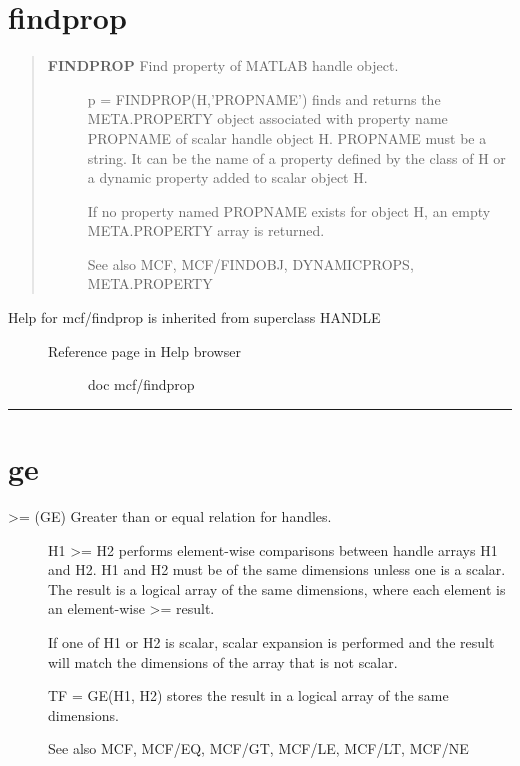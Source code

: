 \documentclass[letterpaper,10pt,english]{sphinxmanual}
\begin{document}
\section{findprop}
\label{classes/utils/@mcf/mcf:findprop}\label{classes/utils/@mcf/mcf:id8}\begin{quote}
\begin{description}
\item[{\textbf{FINDPROP}   Find property of MATLAB handle object.}] \leavevmode
p = FINDPROP(H,'PROPNAME') finds and returns the META.PROPERTY object
associated with property name PROPNAME of scalar handle object H.
PROPNAME must be a string.  It can be the name of a property defined
by the class of H or a dynamic property added to scalar object H.

If no property named PROPNAME exists for object H, an empty
META.PROPERTY array is returned.

See also MCF, MCF/FINDOBJ, DYNAMICPROPS, META.PROPERTY

\end{description}
\end{quote}
\begin{description}
\item[{Help for mcf/findprop is inherited from superclass HANDLE}] \leavevmode\begin{description}
\item[{Reference page in Help browser}] \leavevmode
doc mcf/findprop

\end{description}

\end{description}


\bigskip\hrule{}\bigskip



\section{ge}
\label{classes/utils/@mcf/mcf:ge}\label{classes/utils/@mcf/mcf:id9}\begin{description}
\item[{\textgreater{}= (GE)   Greater than or equal relation for handles.}] \leavevmode
H1 \textgreater{}= H2 performs element-wise comparisons between handle arrays H1 and
H2.  H1 and H2 must be of the same dimensions unless one is a scalar.
The result is a logical array of the same dimensions, where each
element is an element-wise \textgreater{}= result.

If one of H1 or H2 is scalar, scalar expansion is performed and the
result will match the dimensions of the array that is not scalar.

TF = GE(H1, H2) stores the result in a logical array of the same
dimensions.

See also MCF, MCF/EQ, MCF/GT, MCF/LE, MCF/LT, MCF/NE

\end{description}
\end{document}
